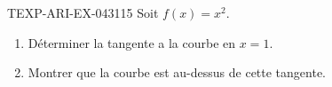 \begin{exercice}{TEXP-ARI-EX-043}{1}{15}
Soit $f(x) = x^2$.
\begin{enumerate}
  \item Déterminer la tangente a la courbe en $x = 1$.
  \item Montrer que la courbe est au-dessus de cette tangente.
\end{enumerate}

\end{exercice}
